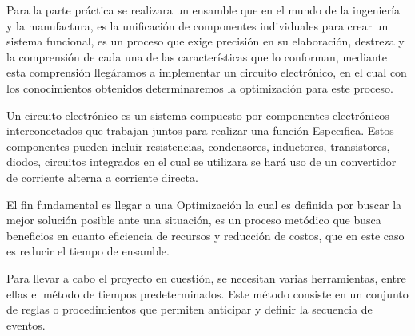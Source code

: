     Para la parte práctica se realizara un ensamble que en el mundo de la ingeniería y la manufactura, es la unificación de componentes individuales para crear un sistema funcional, es un proceso que exige precisión en su elaboración, destreza y la comprensión de cada una de las características que lo conforman, mediante esta comprensión llegáramos a implementar un circuito electrónico, en el cual con los conocimientos obtenidos determinaremos la optimización para este proceso. \cite{Ensamble}
    
    Un circuito electrónico es un sistema compuesto por componentes electrónicos interconectados que trabajan juntos para realizar una función Especıfica. Estos componentes pueden incluir resistencias, condensores, inductores, transistores, diodos, circuitos integrados en el cual se utilizara se hará uso de un convertidor de corriente alterna a corriente directa. \cite{Circuito}
    
    El fin fundamental es llegar a una Optimización la cual es definida por buscar la mejor solución posible ante una situación, es un proceso metódico que busca beneficios en cuanto eficiencia de recursos y reducción de costos, que en este caso es reducir el tiempo de ensamble.\cite{Optimización}
    
    Para llevar a cabo el proyecto en cuestión, se necesitan varias herramientas, entre ellas el método de tiempos predeterminados. Este método consiste en un conjunto de reglas o procedimientos que permiten anticipar y definir la secuencia de eventos.
    
    
    
    
